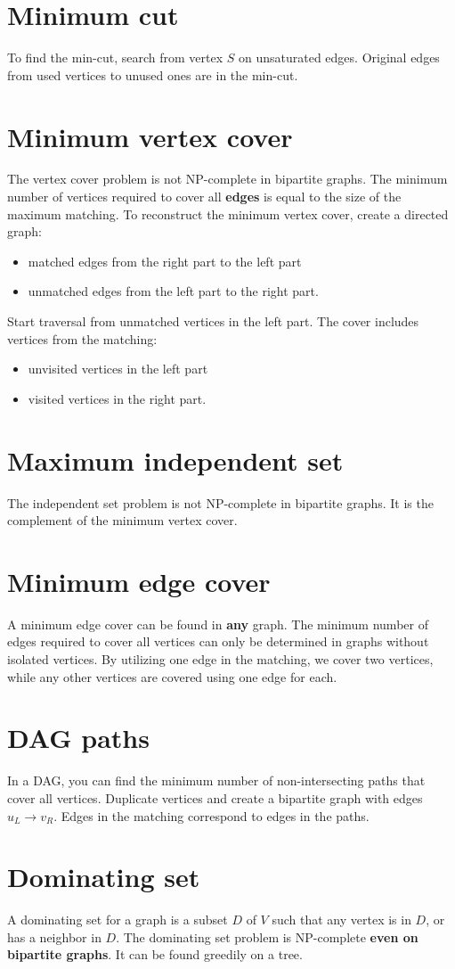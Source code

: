 \section*{Minimum cut}
To find the min-cut, search from vertex $S$ on unsaturated edges. 
Original edges from used vertices to unused ones are in the min-cut.

\section*{Minimum vertex cover}
The vertex cover problem is not NP-complete in bipartite graphs. 
The minimum number of vertices required to cover all \textbf{edges} is equal to the size of the maximum matching. 
To reconstruct the minimum vertex cover, create a directed graph:

\begin{itemize}
\setlength\itemsep{0em}
\item matched edges from the right part to the left part
\item unmatched edges from the left part to the right part.
\end{itemize}

Start traversal from unmatched vertices in the left part.
The cover includes vertices from the matching:
\begin{itemize}
\setlength\itemsep{0em}
\item unvisited vertices in the left part
\item visited vertices in the right part.
\end{itemize}

\section*{Maximum independent set}
The independent set problem is not NP-complete in bipartite graphs. 
It is the complement of the minimum vertex cover.

\section*{Minimum edge cover}
A minimum edge cover can be found in \textbf{any} graph. 
The minimum number of edges required to cover all vertices can only be determined in graphs without isolated vertices.
By utilizing one edge in the matching, we cover two vertices, while any other vertices are covered using one edge for each.

\section*{DAG paths}
In a DAG, you can find the minimum number of non-intersecting paths that cover all vertices. 
Duplicate vertices and create a bipartite graph with edges $u_L \rightarrow v_R$. 
Edges in the matching correspond to edges in the paths.

\section*{Dominating set}
A dominating set for a graph is a subset $D$ of $V$ such that any vertex is in $D$, or has a neighbor in $D$.
The dominating set problem is NP-complete \textbf{even on bipartite graphs}.
It can be found greedily on a tree.
